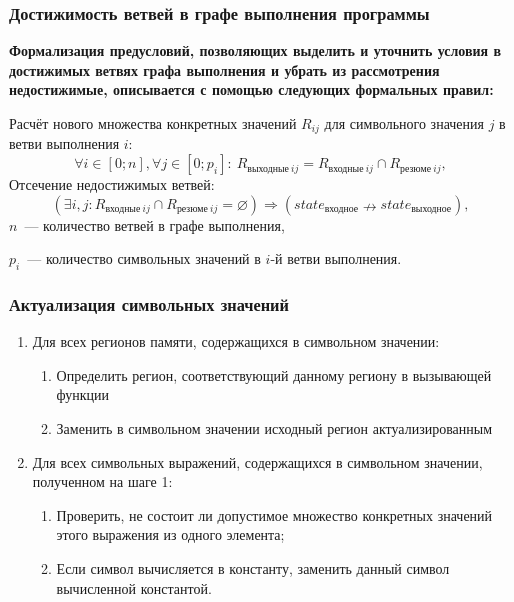 \documentclass[10pt,gray]{beamer}
\begin{document}
\begin{frame}
\frametitle{Достижимость ветвей в графе выполнения программы}

\textbf{Формализация предусловий, позволяющих выделить и уточнить условия в достижимых ветвях графа выполнения и убрать из рассмотрения недостижимые, описывается с помощью следующих формальных правил: }

\vspace{20pt}

Расчёт нового множества конкретных значений $R_{ij}$ для символьного значения $j$ в ветви выполнения $i$:
\begin{equation*}
\label{result_sval}
 \forall i \in [0; n], \forall j \in [0; p_i]:\ R_{\text{выходные}\ ij} =  R_{\text{входные}\ ij} \cap R_{\text{резюме}\ ij},
\end{equation*}
Отсечение недостижимых ветвей:
\begin{equation*}
 \label{empty_set}
 (\exists i, j: R_{\text{входные}\ ij} \cap R_{\text{резюме}\ ij} = \varnothing)  \Rightarrow (state_{\text{входное}} \nrightarrow state_{\text{выходное}}),
\end{equation*}
$n$~--- количество ветвей в графе выполнения,

$p_{i}$~--- количество символьных значений в $i$-й ветви выполнения.


\end{frame}

\begin{frame}
\frametitle{Актуализация символьных значений}

\begin{enumerate}
 \item Для всех регионов памяти, содержащихся в символьном значении:
 \begin{enumerate}
  \item Определить регион, соответствующий данному региону в вызывающей функции
  \item Заменить в символьном значении исходный регион актуализированным
 \end{enumerate}
 \item Для всех символьных выражений, содержащихся в символьном значении, полученном на шаге 1:
  \begin{enumerate}
  \item Проверить, не состоит ли допустимое множество конкретных значений этого выражения из одного элемента;
  \item Если символ вычисляется в константу, заменить данный символ вычисленной константой.
 \end{enumerate}

\end{enumerate}
\end{frame}
\end{document}

